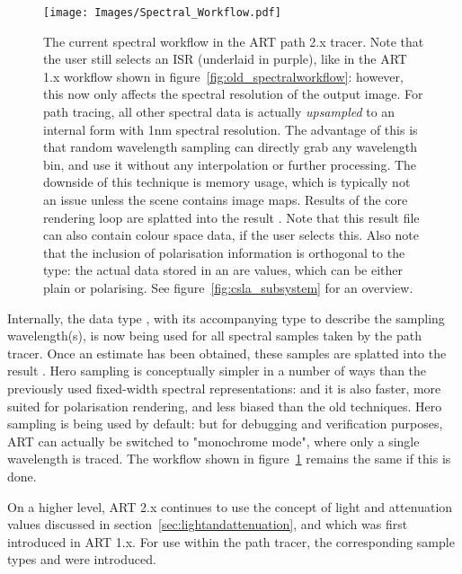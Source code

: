 \begin{figure}[htb]
\begin{center}
\texttt{[image: Images/Spectral\_Workflow.pdf]} 
\end{center}
\caption{
\label{fig:spectralworkflow}
The current spectral workflow in the ART path 2.x tracer. Note that the user still selects an ISR (underlaid in purple), like in the ART 1.x workflow shown in figure~\ref{fig:old_spectralworkflow}: however, this now only affects the spectral resolution of the output image. For path tracing, all other spectral data is actually \emph{upsampled} to an internal form with 1nm spectral resolution. The advantage of this is that random wavelength sampling can directly grab any wavelength bin, and use it without any interpolation or further processing. The downside of this technique is memory usage, which is typically not an issue unless the scene contains image maps. Results of the core rendering loop are splatted into the result . Note that this result file can also contain colour space data, if the user selects this. Also note that the inclusion of polarisation information is orthogonal to the  type: the actual data stored in an  are  values, which can be either plain or polarising. See figure~\ref{fig:csla_subsystem} for an overview. 
}
\end{figure}


Internally, the data type , with its accompanying type  to describe the sampling wavelength(s), is now being used for all spectral samples taken by the path tracer. Once an estimate has been obtained, these samples are splatted into the result . Hero sampling is conceptually simpler in a number of ways than the previously used fixed-width spectral representations: and it is also faster, more suited for polarisation rendering, and less biased than the old techniques. Hero sampling is being used by default: but for debugging and verification purposes, ART can actually be switched to "monochrome mode", where only a single wavelength is traced. The workflow shown in figure~\ref{fig:spectralworkflow} remains the same if this is done.

On a higher level, ART 2.x continues to use the concept of light and attenuation values discussed in section~\ref{sec:lightandattenuation}, and which was first introduced in ART 1.x. For use within the path tracer, the corresponding sample types  and  were introduced.
 
